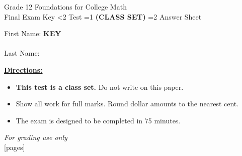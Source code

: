 \documentclass[addpoints]{exam}
\newcommand{\event}{Final Exam}
\newcommand{\tournament}{}
\def\type{0}
\begin{document}
\begin{center}
    {\huge Grade 12 Foundations for College Math \\ \event
    \ifprintanswers \space Key
    \else \space \ifnum\type<2 Test \fi \ifnum\type=1 \textbf{(CLASS SET)} \fi
          \ifnum\type=2 Answer Sheet \fi
    \fi \\ \vspace{3mm}\tournament\vspace{1mm}}
\end{center}

\vspace{.25\textheight}

\begin{center}
    First Name: \ifprintanswers
    \underline{\hspace{3.5cm}}\textbf{KEY}\underline{\hspace{5.5cm}}\\\vspace{5mm}
    \else \underline{\hspace{10cm}}\\ \vspace{5mm} \fi
    Last Name: \underline{\hspace{10cm}}\\ \vspace{5mm}
\end{center}

\noindent\textbf{\underline{Directions:}}
\begin{itemize}
    \ifnum\type=1 \item \textbf{This test is a class set.} Do not write on this paper. \fi
    \item Show all work for full marks. Round dollar amounts to the nearest cent.
    \item The exam is designed to be completed in 75 minutes.
\end{itemize}
\begin{center}
\textit{For grading use only}\\
[pages]
\end{center}
\end{document}
